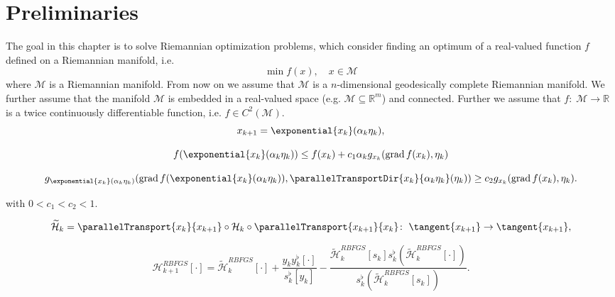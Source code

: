 \section{Preliminaries}

The goal in this chapter is to solve Riemannian optimization problems, which consider finding an optimum of a real-valued function $f$ defined on a Riemannian manifold, i.e.
\begin{equation}\label{RiemannianOptimizationProblem}
    \min f(x), \quad x \in \mathcal{M}
\end{equation}
where $\mathcal{M}$ is a Riemannian manifold. From now on we assume that $\mathcal{M}$ is a $n$-dimensional geodesically complete Riemannian manifold. We further assume that the manifold $\mathcal{M}$ is embedded in a real-valued space (e.g. $\mathcal{M} \subseteq \mathbb{R}^m$) and connected. Further we assume that $f \colon \; \mathcal{M} \to \mathbb{R}$ is a twice continuously differentiable function, i.e. $f \in C^2(\mathcal{M})$. \\

\begin{equation}\label{RiemannianIterativeUpdateScheme}
    x_{k+1} = \exponential{x_k}(\alpha_k \eta_k),
\end{equation}

\begin{equation}\label{RiemannianWolfeConditions1}
    f( \exponential{x_k}(\alpha_k \eta_k)) \leq f(x_k) + c_1 \alpha_k g_{x_k} (\operatorname{grad} f(x_k), \eta_k)
\end{equation}

\begin{equation}\label{RiemannianWolfeConditions2.2}
    g_{\exponential{x_k}(\alpha_k \eta_k)} (\operatorname{grad} f(\exponential{x_k}(\alpha_k \eta_k)), \parallelTransportDir{x_k}{\alpha_k \eta_k}(\eta_k)) \geq c_2 g_{x_k} (\operatorname{grad} f(x_k), \eta_k).
\end{equation}

with $0 < c_1 < c_2 < 1$.

\begin{equation}\label{TransportedOperator}
    \widetilde{\mathcal{H}}_k = \parallelTransport{x_k}{x_{k+1}} \circ \mathcal{H}_k \circ \parallelTransport{x_{k+1}}{x_k} \colon \; \tangent{x_{k+1}} \to \tangent{x_{k+1}},
\end{equation}

\begin{equation}\label{directRiemannianBFGSFormula}
    \mathcal{H}^{RBFGS}_{k+1} [\cdot] = \widetilde{\mathcal{H}}^{RBFGS}_k [\cdot] + \frac{y_k y^{\flat}_k[\cdot]}{s^{\flat}_k [y_k]} - \frac{\widetilde{\mathcal{H}}^{RBFGS}_k [s_k] s^{\flat}_k (\widetilde{\mathcal{H}}^{RBFGS}_k [\cdot])}{s^{\flat}_k (\widetilde{\mathcal{H}}^{RBFGS}_k [s_k])}.
\end{equation}

